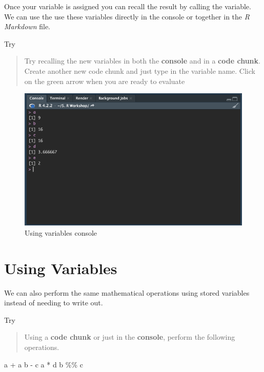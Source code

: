 \documentclass[
]{book}
\newenvironment{Shaded}{\begin{snugshade}}{\end{snugshade}}
\newcommand{\NormalTok}[1]{#1}
\newcommand{\SpecialCharTok}[1]{\textcolor[rgb]{0.00,0.00,0.00}{#1}}
\begin{document}
Once your variable is assigned you can recall the result by calling the variable. We can use the use these variables directly in the console or together in the \emph{R Markdown} file.

Try

\begin{quote}
Try recalling the new variables in both the \textbf{console} and in a \textbf{code chunk}. Create another new code chunk and just type in the variable name. Click on the green arrow when you are ready to evaluate
\end{quote}

\begin{figure}
\includegraphics[width=10.12in]{images/3.4variablesconsole} \caption{Using variables console}\label{fig:unnamed-chunk-15}
\end{figure}

\hypertarget{using-variables}{%
\section{Using Variables}\label{using-variables}}

We can also perform the same mathematical operations using stored variables instead of needing to write out.

Try

\begin{quote}
Using a \textbf{code chunk} or just in the \textbf{console}, perform the following operations.
\end{quote}

\begin{Shaded}
\begin{Highlighting}[]
\NormalTok{a }\SpecialCharTok{+}\NormalTok{ a}
\NormalTok{b }\SpecialCharTok{{-}}\NormalTok{ c}
\NormalTok{a }\SpecialCharTok{*}\NormalTok{ d}
\NormalTok{b }\SpecialCharTok{\%\%}\NormalTok{ c}
\end{Highlighting}
\end{Shaded}
\end{document}
